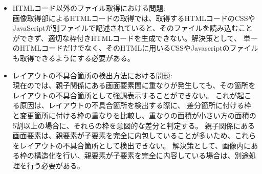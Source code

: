 \begin{itemize}
    \item HTMLコード以外のファイル取得における問題:\\
          画像取得部によるHTMLコードの取得では、取得するHTMLコードのCSSやJavaScriptが別ファイルで記述されていると、そのファイルを読み込むことができず、適切な枠付きHTMLコードを生成できない。解決策として、
          単一のHTMLコードだけでなく、そのHTMLに用いるCSSやJavascriptのファイルも取得できるようにする必要がある。
    \item レイアウトの不具合箇所の検出方法における問題:\\
          現在の\toolName では、親子関係にある画面要素間に重なりが発生しても、その箇所をレイアウトの不具合箇所として強調表示することができない。
          これが起こる原因は、レイアウトの不具合箇所を検出する際に、
          差分箇所に付ける枠と変更箇所に付ける枠の重なりを比較し、重なりの面積が小さい方の面積の5割以上の場合に、それらの枠を意図的な差分と判定する。
          親子関係にある画面要素は、親要素が子要素を完全に内包していることが多いため、これらをレイアウトの不具合箇所として検出できない。
          解決策として、画像内にある枠の構造化を行い、親要素が子要素を完全に内容している場合は、別途処理を行う必要がある。
\end{itemize}
